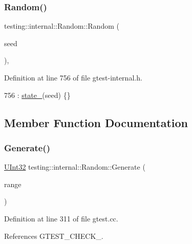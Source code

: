 \subsubsection{\texorpdfstring{Random()}{Random()}}
{\footnotesize\ttfamily testing\+::internal\+::\+Random\+::\+Random (\begin{DoxyParamCaption}\item[{\hyperlink{namespacetesting_1_1internal_a40d4fffcd2bf56f18b1c380615aa85e3}{U\+Int32}}]{seed }\end{DoxyParamCaption})\hspace{0.3cm}{\ttfamily [inline]}, {\ttfamily [explicit]}}



Definition at line 756 of file gtest-\/internal.\+h.


\begin{DoxyCode}
756 : \hyperlink{classtesting_1_1internal_1_1Random_ad500e33e3342415afb8a3ab242afa9cc}{state\_}(seed) \{\}
\end{DoxyCode}


\subsection{Member Function Documentation}
\mbox{\label{classtesting_1_1internal_1_1Random_a9315b7fb621cbcfdf92ed4b5e584c0db}} 
\subsubsection{\texorpdfstring{Generate()}{Generate()}}
{\footnotesize\ttfamily \hyperlink{namespacetesting_1_1internal_a40d4fffcd2bf56f18b1c380615aa85e3}{U\+Int32} testing\+::internal\+::\+Random\+::\+Generate (\begin{DoxyParamCaption}\item[{\hyperlink{namespacetesting_1_1internal_a40d4fffcd2bf56f18b1c380615aa85e3}{U\+Int32}}]{range }\end{DoxyParamCaption})}



Definition at line 311 of file gtest.\+cc.



References G\+T\+E\+S\+T\+\_\+\+C\+H\+E\+C\+K\+\_\+.



